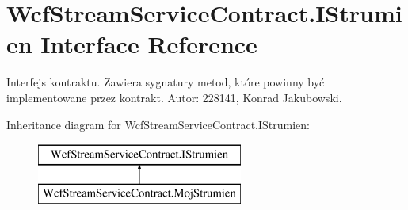 \hypertarget{interface_wcf_stream_service_contract_1_1_i_strumien}{}\section{Wcf\+Stream\+Service\+Contract.\+I\+Strumien Interface Reference}
\label{interface_wcf_stream_service_contract_1_1_i_strumien}


Interfejs kontraktu. Zawiera sygnatury metod, które powinny być implementowane przez kontrakt. Autor\+: 228141, Konrad Jakubowski.  


Inheritance diagram for Wcf\+Stream\+Service\+Contract.\+I\+Strumien\+:\begin{figure}[H]
\begin{center}
\leavevmode
\includegraphics[height=2.000000cm]{interface_wcf_stream_service_contract_1_1_i_strumien}
\end{center}
\end{figure}

